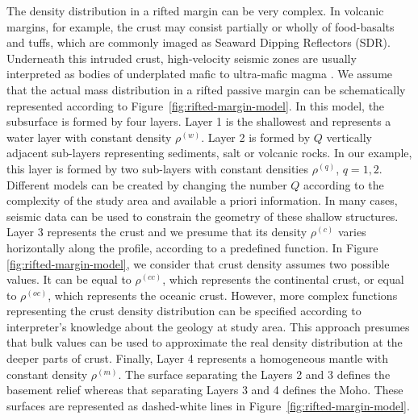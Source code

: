 \documentclass[manuscript]{geophysics}
\begin{document}
The density distribution in a rifted margin can be very complex.
In volcanic margins, for example, the crust may consist partially or wholly of 
food-basalts and tuffs, which are commonly imaged as Seaward Dipping Reflectors (SDR).
Underneath this intruded crust, high-velocity seismic zones are usually interpreted 
as bodies of underplated mafic to ultra-mafic magma \citep{geoffroy2005}.
We assume that the actual mass distribution in a rifted passive margin can be 
schematically represented according to Figure~\ref{fig:rifted-margin-model}. 
In this model, the subsurface is formed by four layers. 
Layer 1 is the shallowest and represents a water layer with constant density
$\rho^{(w)}$. 
Layer 2 is formed by $Q$ vertically adjacent sub-layers representing 
sediments, salt or volcanic rocks.
In our example, this layer is formed by two sub-layers with constant densities
$\rho^{(q)}$, $q = 1, 2$. Different models can be created by changing the number $Q$
according to the complexity of the study area and available a priori information.
In many cases, seismic data can be used to constrain the geometry of these 
shallow structures.
Layer 3 represents the crust and we presume that its density $\rho^{(c)}$
varies horizontally along the profile, according to a predefined function.
In Figure \ref{fig:rifted-margin-model}, we consider that crust density assumes 
two possible values. It can be equal to $\rho^{(cc)}$, which
represents the continental crust, or equal to $\rho^{(oc)}$, which represents the
oceanic crust.
However, more complex functions representing the crust density distribution can be
specified according to interpreter's knowledge about the geology at study area.
This approach presumes that bulk values can be used 
to approximate the real density distribution at the deeper parts of crust. 
Finally, Layer 4 represents a homogeneous mantle with constant density $\rho^{(m)}$. 
The surface separating the Layers 2 and 3 defines the basement relief whereas
that separating Layers 3 and 4 defines the Moho. These surfaces are
represented as dashed-white lines in Figure~\ref{fig:rifted-margin-model}.
\end{document}
